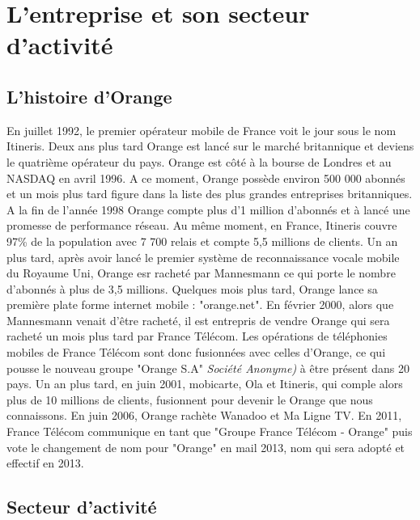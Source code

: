\chapter{L'entreprise et son secteur d'activité}
\label{chap:premierchapitre}

\section{L'histoire d'Orange}


En juillet 1992, le premier opérateur mobile  de France voit le jour sous le nom Itineris. Deux ans plus tard Orange est lancé sur le marché britannique et deviens le quatrième opérateur du pays. Orange est côté à la bourse de Londres et au NASDAQ en avril 1996. A ce moment, Orange possède environ 500 000 abonnés et un mois plus tard figure dans la liste des plus grandes entreprises britanniques. A la fin de l'année 1998 Orange compte plus d'1 million d'abonnés et à lancé une promesse de performance réseau. Au même moment, en France, Itineris couvre 97\% de la population avec 7 700 relais et compte 5,5 millions de clients. Un an plus tard, après avoir lancé le premier système de reconnaissance vocale mobile du Royaume Uni, Orange esr racheté par Mannesmann ce qui porte le nombre d'abonnés à plus de 3,5 millions. Quelques mois plus tard, Orange lance sa première plate forme internet mobile : "orange.net". En février 2000, alors que Mannesmann venait d'être racheté, il est entrepris de vendre Orange qui sera racheté un mois plus tard par France Télécom. Les opérations de téléphonies mobiles de France Télécom sont donc fusionnées avec celles d'Orange, ce qui pousse le nouveau groupe "Orange S.A" \textit{Société Anonyme)} à être présent dans 20 pays. Un an plus tard, en juin 2001, mobicarte, Ola et Itineris, qui comple alors plus de 10 millions de clients, fusionnent pour devenir le Orange que nous connaissons. En juin 2006, Orange rachète Wanadoo et Ma Ligne TV. En 2011, France Télécom communique en tant que "Groupe France Télécom - Orange" puis vote le changement de nom pour "Orange" en mail 2013, nom qui sera adopté et effectif en 2013.



\section{Secteur d'activité}

